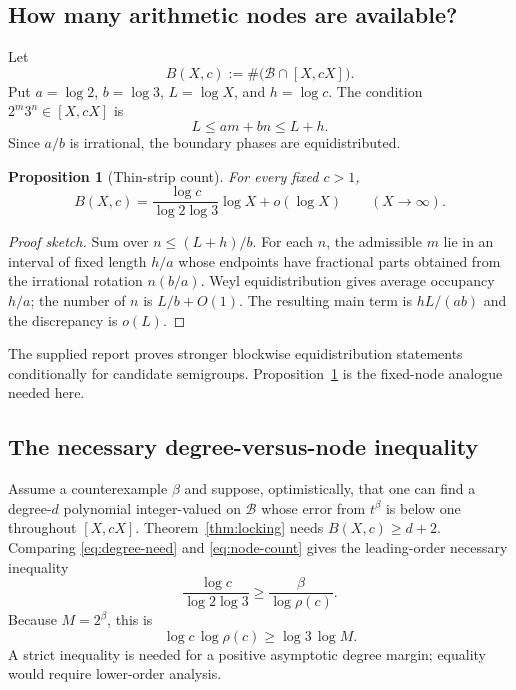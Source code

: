 \documentclass[11pt,oneside]{article}
\newtheorem{proposition}[theorem]{Proposition}
\theoremstyle{definition}
\theoremstyle{remark}
\newcommand{\Bsem}{\mathcal B}
\begin{document}
\subsection{How many arithmetic nodes are available?}

Let
\[
 B(X,c):=\#\bigl(\Bsem\cap[X,cX]\bigr).
\]
Put $a=\log2$, $b=\log3$, $L=\log X$, and $h=\log c$.  The condition
$2^m3^n\in[X,cX]$ is
\[
 L\le am+bn\le L+h.
\]
Since $a/b$ is irrational, the boundary phases are equidistributed.

\begin{proposition}[Thin-strip count]
\label{prop:thin-strip}
For every fixed $c>1$,
\begin{equation}
 B(X,c)=\frac{\log c}{\log2\log3}\log X+o(\log X)
 \qquad(X\to\infty).
 \label{eq:node-count}
\end{equation}
\end{proposition}

\begin{proof}[Proof sketch]
Sum over $n\le(L+h)/b$.  For each $n$, the admissible $m$ lie in an interval of fixed length
$h/a$ whose endpoints have fractional parts obtained from the irrational rotation
$n(b/a)$.  Weyl equidistribution gives average occupancy $h/a$; the number of $n$ is
$L/b+O(1)$.  The resulting main term is $hL/(ab)$ and the discrepancy is $o(L)$.
\end{proof}

The supplied report proves stronger blockwise equidistribution statements conditionally for
candidate semigroups.  Proposition~\ref{prop:thin-strip} is the fixed-node analogue needed
here.

\subsection{The necessary degree-versus-node inequality}

Assume a counterexample $\beta$ and suppose, optimistically, that one can find a degree-$d$
polynomial integer-valued on $\Bsem$ whose error from $t^\beta$ is below one throughout
$[X,cX]$.  Theorem~\ref{thm:locking} needs $B(X,c)\ge d+2$.  Comparing
\eqref{eq:degree-need} and \eqref{eq:node-count} gives the leading-order necessary inequality
\begin{equation}
 \frac{\log c}{\log2\log3}\ge
 \frac{\beta}{\log\rho(c)}.
 \label{eq:raw-efficiency}
\end{equation}
Because $M=2^\beta$, this is
\begin{equation}
 \boxed{\quad
   \log c\,\log\rho(c)\ge\log3\,\log M.
 \quad}
 \label{eq:efficiency-condition}
\end{equation}
A strict inequality is needed for a positive asymptotic degree margin; equality would require
lower-order analysis.
\end{document}
